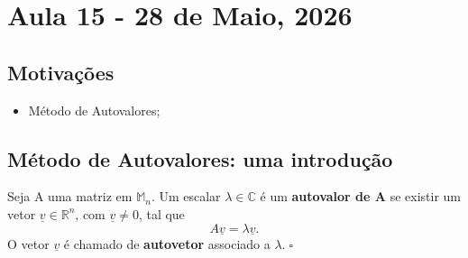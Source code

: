 \documentclass[../numerical_methods.tex]{subfiles}
\begin{document}
\section{Aula 15 - 28 de Maio, 2026}
\subsection{Motivações}
\begin{itemize}
	\item Método de Autovalores;
\end{itemize}
\subsection{Método de Autovalores: uma introdução}
\begin{def*}
	Seja A uma matriz em \(\mathbb{M}_{n}\). Um escalar \(\lambda \in \mathbb{C}\) é um \textbf{autovalor de A} se existir um vetor \(\underline{v}\in \mathbb{R}^{n}\), com \(\underline{v}\neq 0\), tal que
	\[
		A \underline{v} = \lambda \underline{v}.
	\]
	O vetor \(\underline{v}\) é chamado de \textbf{autovetor} associado a \(\lambda.\; \square\)
\end{def*}
\end{document}
